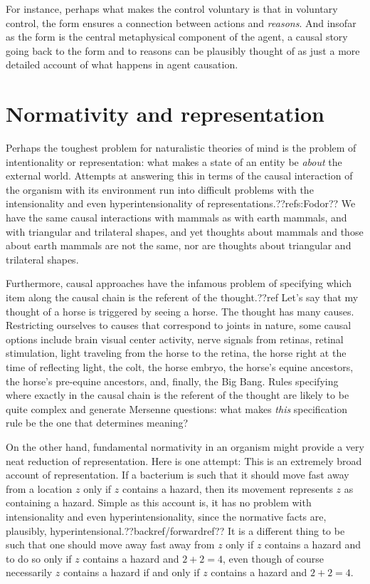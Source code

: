 For instance, perhaps what makes the control voluntary is that in voluntary control, the form ensures a connection between
actions and \textit{reasons}. And insofar as the form is the central metaphysical component of the agent, a causal story 
going back to the form and to reasons can be plausibly thought of as just a more detailed account of what happens in 
agent causation.

\section{Normativity and representation}
Perhaps the toughest problem for naturalistic theories of mind is the problem of intentionality or representation:
what makes a state of an entity be \textit{about} the external world. Attempts at answering this in terms of the 
causal interaction of the organism with its environment run into difficult problems with the intensionality and 
even hyperintensionality of representations.??refs:Fodor?? We have the same causal interactions with mammals as with earth mammals,
and with triangular and trilateral shapes, and yet thoughts about mammals and those about earth mammals are not the same,
nor are thoughts about triangular and trilateral shapes. 

Furthermore, causal approaches have the infamous problem of specifying which item along the causal chain is the referent of 
the thought.??ref Let's say that my thought of a horse is triggered by seeing a horse. The thought has many causes. 
Restricting ourselves to causes that correspond to joints in nature, some causal options include brain 
visual center activity, nerve signals from retinas, retinal stimulation, light traveling from the horse 
to the retina, the horse right at the time of reflecting light, the colt, the horse embryo, the horse's equine 
ancestors, the horse's pre-equine ancestors, and, finally, the Big Bang. Rules specifying where exactly in the causal 
chain is the referent of the thought are likely to be quite complex and generate Mersenne questions: what makes 
\textit{this} specification rule be the one that determines meaning?

On the other hand, fundamental normativity in an organism might provide a very neat reduction of representation. Here is one attempt: 
 This is an extremely broad account of representation. If a bacterium is such that it 
should move fast away from a location $z$ only if $z$ contains a hazard, then its movement represents $z$ as containing 
a hazard. Simple as this account is, it has no problem with intensionality and even hyperintensionality, since the 
normative facts are, plausibly, hyperintensional.??backref/forwardref?? It is a different thing to be such that one should move 
away fast away from $z$ only if $z$ contains a hazard and to do so only if $z$ contains a hazard and $2+2=4$, even though
of course necessarily $z$ contains a hazard if and only if $z$ contains a hazard and $2+2=4$.

